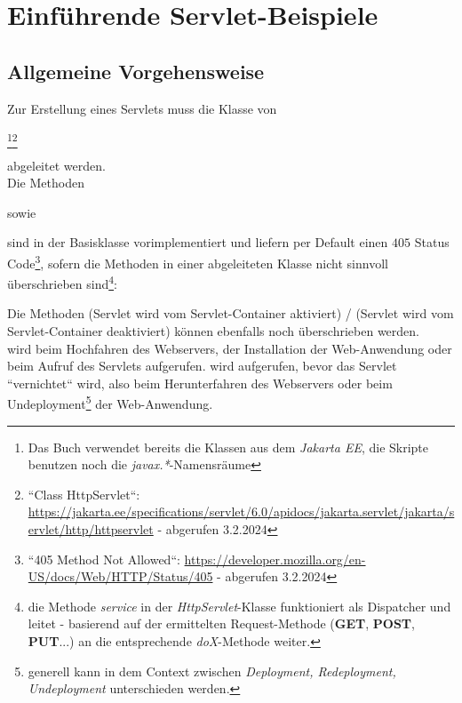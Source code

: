 \section{Einführende Servlet-Beispiele}

\subsection{Allgemeine Vorgehensweise}

Zur Erstellung eines Servlets muss die Klasse von \begin{center}\footnote{
    Das Buch verwendet bereits die Klassen aus dem \textit{Jakarta EE}, die Skripte benutzen noch die \textit{javax.*}-Namensräume
}\footnote{
    ``Class HttpServlet``: \url{https://jakarta.ee/specifications/servlet/6.0/apidocs/jakarta.servlet/jakarta/servlet/http/httpservlet} - abgerufen 3.2.2024
}\end{center} abgeleitet werden.\\

\noindent
Die Methoden \begin{center}\end{center} sowie \begin{center}\end{center} sind in der Basisklasse vorimplementiert und liefern per Default einen $405$ Status Code\footnote{
    ``405 Method Not Allowed``: \url{https://developer.mozilla.org/en-US/docs/Web/HTTP/Status/405} - abgerufen 3.2.2024
}, sofern die Methoden in einer abgeleiteten Klasse nicht sinnvoll überschrieben sind\footnote{
die Methode \textit{service} in der \textit{HttpServlet}-Klasse funktioniert als Dispatcher und leitet - basierend auf der ermittelten Request-Methode (\textbf{GET}, \textbf{POST}, \textbf{PUT}...) an die entsprechende \textit{doX}-Methode weiter.
}:

\noindent
Die Methoden  (Servlet wird vom Servlet-Container aktiviert) /  (Servlet wird vom Servlet-Container deaktiviert) können ebenfalls noch überschrieben werden.\\

\noindent
{} wird beim Hochfahren des Webservers, der Installation der Web-Anwendung oder beim Aufruf des Servlets aufgerufen.
 wird aufgerufen, bevor das Servlet ``vernichtet`` wird, also beim Herunterfahren des Webservers oder beim Undeployment\footnote{
generell kann in dem Context zwischen \textit{Deployment, Redeployment, Undeployment} unterschieden werden.
} der Web-Anwendung. \\

